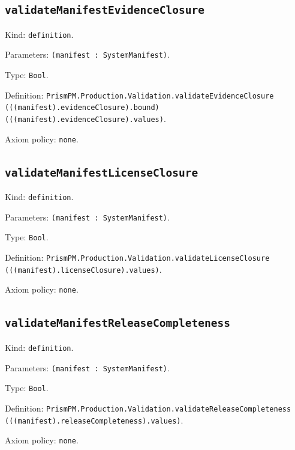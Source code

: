 \documentclass[11pt]{article}
\begin{document}
\subsection*{\texttt{validateManifestEvidenceClosure}}
\noindent Kind: \texttt{definition}.\par
\noindent Parameters: \texttt{(manifest : SystemManifest)}.\par
\noindent Type: \texttt{Bool}.\par
\noindent Definition: \texttt{PrismPM.Production.Validation.validateEvidenceClosure (((manifest).evidenceClosure).bound) (((manifest).evidenceClosure).values)}.\par
\noindent Axiom policy: \texttt{none}.\par
\subsection*{\texttt{validateManifestLicenseClosure}}
\noindent Kind: \texttt{definition}.\par
\noindent Parameters: \texttt{(manifest : SystemManifest)}.\par
\noindent Type: \texttt{Bool}.\par
\noindent Definition: \texttt{PrismPM.Production.Validation.validateLicenseClosure (((manifest).licenseClosure).values)}.\par
\noindent Axiom policy: \texttt{none}.\par
\subsection*{\texttt{validateManifestReleaseCompleteness}}
\noindent Kind: \texttt{definition}.\par
\noindent Parameters: \texttt{(manifest : SystemManifest)}.\par
\noindent Type: \texttt{Bool}.\par
\noindent Definition: \texttt{PrismPM.Production.Validation.validateReleaseCompleteness (((manifest).releaseCompleteness).values)}.\par
\noindent Axiom policy: \texttt{none}.\par
\end{document}
